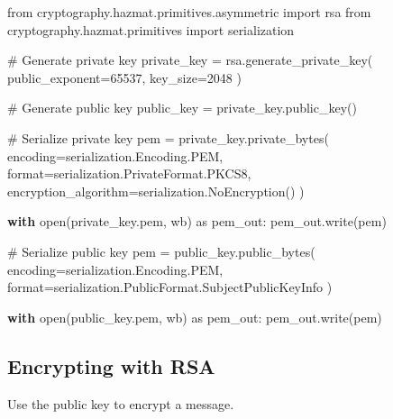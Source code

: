 \documentclass[
  letterpaper,
  DIV=11,
  numbers=noendperiod]{scrreprt}
\newenvironment{Shaded}{\begin{snugshade}}{\end{snugshade}}
\newcommand{\BuiltInTok}[1]{\textcolor[rgb]{0.00,0.23,0.31}{#1}}
\newcommand{\CommentTok}[1]{\textcolor[rgb]{0.37,0.37,0.37}{#1}}
\newcommand{\ControlFlowTok}[1]{\textcolor[rgb]{0.00,0.23,0.31}{\textbf{#1}}}
\newcommand{\DecValTok}[1]{\textcolor[rgb]{0.68,0.00,0.00}{#1}}
\newcommand{\ImportTok}[1]{\textcolor[rgb]{0.00,0.46,0.62}{#1}}
\newcommand{\NormalTok}[1]{\textcolor[rgb]{0.00,0.23,0.31}{#1}}
\newcommand{\OperatorTok}[1]{\textcolor[rgb]{0.37,0.37,0.37}{#1}}
\newcommand{\StringTok}[1]{\textcolor[rgb]{0.13,0.47,0.30}{#1}}
\begin{document}
\begin{Shaded}
\begin{Highlighting}[]
\ImportTok{from}\NormalTok{ cryptography.hazmat.primitives.asymmetric }\ImportTok{import}\NormalTok{ rsa}
\ImportTok{from}\NormalTok{ cryptography.hazmat.primitives }\ImportTok{import}\NormalTok{ serialization}

\CommentTok{\# Generate private key}
\NormalTok{private\_key }\OperatorTok{=}\NormalTok{ rsa.generate\_private\_key(}
\NormalTok{    public\_exponent}\OperatorTok{=}\DecValTok{65537}\NormalTok{,}
\NormalTok{    key\_size}\OperatorTok{=}\DecValTok{2048}
\NormalTok{)}

\CommentTok{\# Generate public key}
\NormalTok{public\_key }\OperatorTok{=}\NormalTok{ private\_key.public\_key()}

\CommentTok{\# Serialize private key}
\NormalTok{pem }\OperatorTok{=}\NormalTok{ private\_key.private\_bytes(}
\NormalTok{    encoding}\OperatorTok{=}\NormalTok{serialization.Encoding.PEM,}
    \BuiltInTok{format}\OperatorTok{=}\NormalTok{serialization.PrivateFormat.PKCS8,}
\NormalTok{    encryption\_algorithm}\OperatorTok{=}\NormalTok{serialization.NoEncryption()}
\NormalTok{)}

\ControlFlowTok{with} \BuiltInTok{open}\NormalTok{(}\StringTok{\textquotesingle{}private\_key.pem\textquotesingle{}}\NormalTok{, }\StringTok{\textquotesingle{}wb\textquotesingle{}}\NormalTok{) }\ImportTok{as}\NormalTok{ pem\_out:}
\NormalTok{    pem\_out.write(pem)}

\CommentTok{\# Serialize public key}
\NormalTok{pem }\OperatorTok{=}\NormalTok{ public\_key.public\_bytes(}
\NormalTok{    encoding}\OperatorTok{=}\NormalTok{serialization.Encoding.PEM,}
    \BuiltInTok{format}\OperatorTok{=}\NormalTok{serialization.PublicFormat.SubjectPublicKeyInfo}
\NormalTok{)}

\ControlFlowTok{with} \BuiltInTok{open}\NormalTok{(}\StringTok{\textquotesingle{}public\_key.pem\textquotesingle{}}\NormalTok{, }\StringTok{\textquotesingle{}wb\textquotesingle{}}\NormalTok{) }\ImportTok{as}\NormalTok{ pem\_out:}
\NormalTok{    pem\_out.write(pem)}
\end{Highlighting}
\end{Shaded}

\subsection{Encrypting with RSA}\label{encrypting-with-rsa}

Use the public key to encrypt a message.
\end{document}
